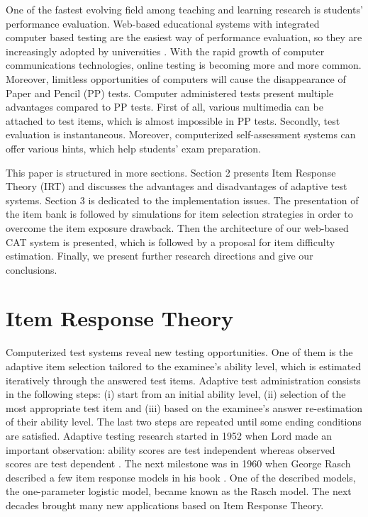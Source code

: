 \documentclass[11pt,twoside]{article}
\begin{document}
One of the fastest evolving field among teaching and learning research is students' performance evaluation. Web-based educational systems with integrated computer based testing are the easiest way of performance evaluation, so they are increasingly adopted by universities \cite{BARLA, BAYLARI, LILLEY}. With the rapid growth of computer communications technologies, online testing is becoming more and more common. Moreover, limitless opportunities of computers will cause the disappearance of Paper and Pencil (PP) tests. Computer administered tests present multiple advantages compared to PP tests. First of all, various multimedia can be attached to test items, which is almost impossible in PP tests. Secondly,  test evaluation is instantaneous. Moreover, computerized self-assessment systems can offer various hints, which  help students' exam preparation.

This paper is structured in more sections. Section 2 presents Item Response Theory (IRT) and discusses the advantages and disadvantages of adaptive test systems. Section 3 is dedicated to the implementation issues. The presentation of the item bank is followed by simulations for item selection strategies in order to overcome the item exposure drawback. Then the architecture of our web-based CAT system is presented, which is followed by a proposal for item difficulty estimation. Finally, we present further research directions and give our conclusions.


\section{Item Response Theory }

Computerized test systems reveal new testing opportunities. One of them is the adaptive item selection tailored to the examinee's ability level, which is estimated iteratively through the answered test items. Adaptive test administration consists in the following steps:  (i) start from an initial ability level, (ii) selection of the most appropriate test item  and (iii) based on the examinee's answer re-estimation of their ability level. The last two steps are repeated until some ending conditions are satisfied. Adaptive testing  research started in 1952 when Lord made an important observation: ability scores are test independent whereas observed scores are test dependent \cite{HAMBLETON}. The next  milestone was in 1960 when George Rasch described  a few item response models in his book \cite{RASCH}. One of the described models, the one-parameter logistic model, became known as the Rasch model. The next decades brought many new applications based on Item Response Theory. 
\end{document}
